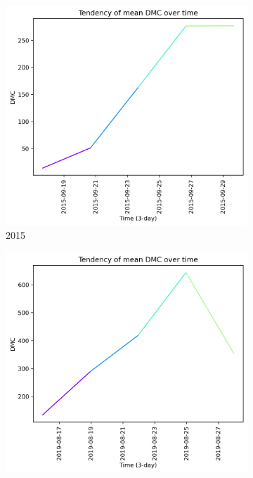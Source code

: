 \begin{figure}[h]
    \centering
    \caption{DMC values 15 days prior to wildfire}
    \begin{subfigure}{0.3\textwidth}
        \centering
        \includegraphics[width=\textwidth]{graphs/2015/15daysprior/2015_15daysprior_tendency_graph_DMC.png}
        \caption{2015}
        \label{fig:dmc_prior_15_days_2015}
    \end{subfigure}
    \hfill
    \begin{subfigure}{0.3\textwidth}
        \centering
        \includegraphics[width=\textwidth]{graphs/2019/15daysprior/2019_15daysprior_tendency_graph_DMC.png}

\end{subfigure}
\end{figure}
